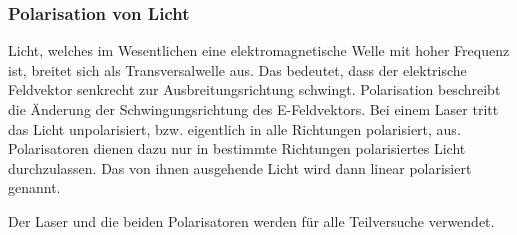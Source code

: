 		\subsubsection{Polarisation von Licht} \label{sec:Polarisation}
		
			Licht, welches im Wesentlichen eine elektromagnetische Welle mit hoher Frequenz ist, breitet sich als Transversalwelle aus. 
			Das bedeutet, dass der elektrische Feldvektor senkrecht zur Ausbreitungsrichtung schwingt. 
			Polarisation beschreibt die Änderung der Schwingungsrichtung des E-Feldvektors.
			Bei einem Laser tritt das Licht unpolarisiert, bzw. eigentlich in alle Richtungen polarisiert, aus.
			Polarisatoren dienen dazu nur in bestimmte Richtungen polarisiertes Licht durchzulassen.
			Das von ihnen ausgehende Licht wird dann linear polarisiert genannt.
			
			Der Laser und die beiden Polarisatoren werden für alle Teilversuche verwendet.
			
